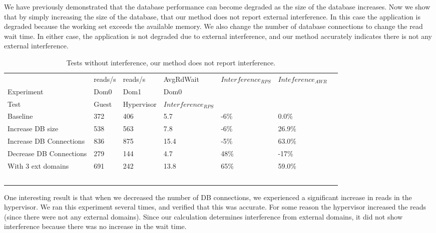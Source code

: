 We have previously demonstrated that the database performance can become degraded as the size of the database increases.  Now we show that by simply increasing the size of the database, that our method does not report external interference.  In this case the application is degraded because the working set exceeds the available memory.  We also change the number of database connections to change the read wait time.  In either case, the application is not degraded due to external interference, and our method accurately indicates there is not any external interference.

\begin{table}[h]
\begingroup
    \fontsize{10pt}{12pt}\selectfont
\begin{tabular}{ l l l l l l p{9cm} }
                   & reads/s & reads/s & AvgRdWait & $Interference_{RPS}$ & $Inteference_{AWR}$ \\
	Experiment     & Dom0     & Dom1     & Dom0      &                &             \\

    Test & Guest & Hypervisor  & $Interference_{RPS}$ \\
    \hline
    Baseline                   & 372 & 406 & 5.7 & -6\% & 0.0\%   \\  %
    Increase DB size           & 538 & 563 & 7.8 & -6\% & 26.9\% \\  %
    Increase DB Connections    & 836 & 875 &15.4 & -5\% & 63.0\% \\  %
	Decrease DB Connections    & 279 & 144 & 4.7 & 48\% & -17\%  \\  %
    With 3 ext domains         & 691 & 242 &13.8 & 65\% & 59.0\% \\  %
    \hline
  \end{tabular}
\caption{Tests without interference, our method does not report interference. }
\label{tab:HypervisorGuest}
\endgroup
\end{table}

One interesting result is that when we decreased the number of DB connections, we experienced a significant increase in reads in the hypervisor.  We ran this experiment several times, and verified that this was accurate.  For some reason the hypervisor increased the reads (since there were not any external domains).  Since our calculation determines interference from external domains, it did not show interference because there was no increase in the wait time.

